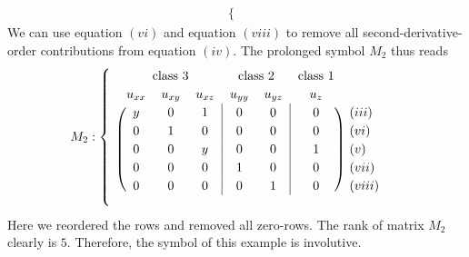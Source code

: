 \begin{example}
\begin{align}
\begin{cases}
            \end{cases}
\end{align}
We can use equation $(vi)$ and equation $(viii)$ to remove all second-derivative-order contributions from equation $(iv)$.
The prolonged symbol $M_2$ thus reads
\begin{align}
M_2 : \begin{cases}
\ \ 
\begin{blockarray}{ccccccc}
\BAmulticolumn{3}{c}{\text{class 3}} & 
\BAmulticolumn{2}{c}{\text{class 2}} & 
\text{class 1} \\
u_{xx} & u_{xy} & u_{xz} & u_{yy} & u_{yz} & u_{z} \\
\begin{block}{(ccc|cc|c)l}
  y & 0 & 1 & 0 & 0 & 0 & (iii) \\
  0 & 1 & 0 & 0 & 0 & 0 & (vi) \\
  0 & 0 & y & 0 & 0 & 1 & (v) \\
  0 & 0 & 0 & 1 & 0 & 0 & (vii) \\
  0 & 0 & 0 & 0 & 1 & 0 & (viii) \\
\end{block}
\end{blockarray}
\end{cases}
\end{align}
Here we reordered the rows and removed all zero-rows. The rank of matrix $M_2$ clearly is $5$. Therefore, the symbol of this example is involutive.
\end{example}

